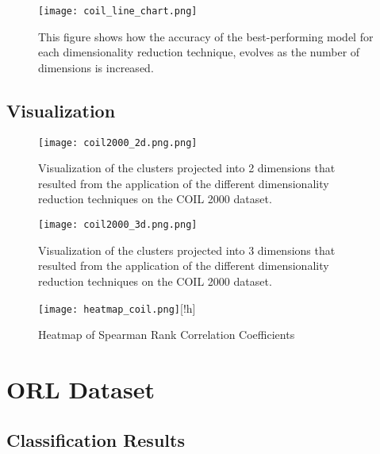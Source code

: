 \begin{figure}[!h]
    \centering
    \texttt{[image: coil\_line\_chart.png]}
    \caption{This figure shows how the accuracy of the best-performing model for each dimensionality reduction technique, evolves as the number of dimensions is increased.}
    \label{fig:coil_line_chart}
\end{figure}

\subsection{Visualization}

\begin{figure}[!h]
    \centering
    \texttt{[image: coil2000\_2d.png.png]}
    \caption{Visualization of the clusters projected into 2 dimensions that resulted from the application of the different dimensionality reduction techniques on the COIL 2000 dataset.}
    \label{fig:coil-2d}
\end{figure}

\begin{figure}[!h]
    \centering
    \texttt{[image: coil2000\_3d.png.png]}
    \caption{Visualization of the clusters projected into 3 dimensions that resulted from the application of the different dimensionality reduction techniques on the COIL 2000 dataset.}
    \label{fig:coil-3d}
\end{figure}

\begin{figure}
    \centering
    \texttt{[image: heatmap\_coil.png]}[!h]
    \caption{Heatmap of Spearman Rank Correlation Coefficients}
    \label{fig:heatmap-coil}
\end{figure}


\section{ORL Dataset}

\subsection{Classification Results}

